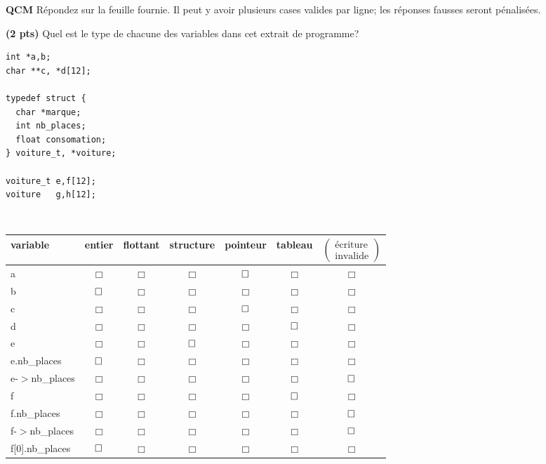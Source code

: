 \documentclass[10pt]{article}
\newcommand{\BoxRep}{\ifcorrection{\boxtimes}{\Box}}
\begin{document}
\begin{Exercice} \textbf{QCM}
Répondez sur la feuille fournie. Il peut y avoir plusieurs cases valides par
ligne; les réponses fausses seront pénalisées.

\Question \textbf{(2 pts)} Quel est le type de chacune des variables dans cet
extrait de programme?

\noindent\hspace{-.8em}\begin{minipage}{.28\linewidth}
\begin{Verbatim}
int *a,b;
char **c, *d[12];

typedef struct {
  char *marque;
  int nb_places;
  float consomation;
} voiture_t, *voiture; 

voiture_t e,f[12];
voiture   g,h[12];
\end{Verbatim}  
\end{minipage}~\begin{minipage}{.7\linewidth}
\begin{tabular}{|l|c|c|c|c|c|c|}\hline
  variable & entier & flottant & structure & pointeur & tableau & 
  $\left(\!\!\begin{array}{c}
    \text{écriture}\\
    \text{invalide}
  \end{array}\!\!\right)$ \\\hline
  a & $\Box$ & $\Box$ & $\Box$ & $\BoxRep$ & $\Box$ & $\Box$\\\hline
  b & $\BoxRep$ & $\Box$ & $\Box$ & $\Box$ & $\Box$ & $\Box$\\\hline
  c & $\Box$ & $\Box$ & $\Box$ & $\BoxRep$ & $\Box$ & $\Box$\\\hline
  d & $\Box$ & $\Box$ & $\Box$ & $\Box$ & $\BoxRep$ & $\Box$\\\hline
  e & $\Box$ & $\Box$ & $\BoxRep$ & $\Box$ & $\Box$ & $\Box$\\\hline
  e.nb\_places    & $\BoxRep$ & $\Box$ & $\Box$ & $\Box$ & $\Box$ & $\Box$\\\hline
  e-$>$nb\_places & $\Box$ & $\Box$ & $\Box$ & $\Box$ & $\Box$ & $\BoxRep$\\\hline
  f & $\Box$ & $\Box$ & $\Box$ & $\Box$ & $\BoxRep$ & $\Box$\\\hline
  f.nb\_places    & $\Box$ & $\Box$ & $\Box$ & $\Box$ & $\Box$ & $\BoxRep$\\\hline
  f-$>$nb\_places & $\Box$ & $\Box$ & $\Box$ & $\Box$ & $\Box$ & $\BoxRep$\\\hline
  f[0].nb\_places    & $\BoxRep$ & $\Box$ & $\Box$ & $\Box$ & $\Box$ & $\Box$\\\hline

\end{tabular}
\end{minipage}
\end{Exercice}
\end{document}
